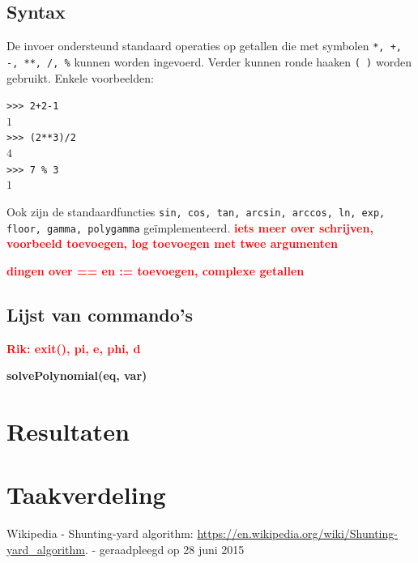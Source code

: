 \documentclass[a4paper]{article}
\newcommand{\rcom}[1]{\textbf{\textcolor{red}{#1}}}
\begin{document}
\subsection{Syntax}
De invoer ondersteund standaard operaties op getallen die met symbolen \texttt{*, +, -, **, /, \%} kunnen worden ingevoerd. Verder kunnen ronde haaken \texttt{( )} worden gebruikt. Enkele voorbeelden:
\begin{adjustwidth}{1.5cm}{}
\texttt{>>> 2+2-1}\\
$1$\\
\texttt{>>> (2**3)/2}\\
$4$\\
\texttt{>>> 7 \% 3}\\
$1$
\end{adjustwidth}
Ook zijn de standaardfuncties \texttt{sin, cos, tan, arcsin, arccos, ln, exp, floor, gamma, polygamma} ge\"implementeerd. \rcom{iets meer over schrijven, voorbeeld toevoegen, log toevoegen met twee argumenten}

\rcom{dingen over == en := toevoegen, complexe getallen}

\subsection{Lijst van commando's}
\rcom{Rik: exit(), pi, e, phi, d}

\textbf{solvePolynomial(eq, var)}



\section{Resultaten}

\section{Taakverdeling}





\begin{thebibliography}{99}

 Wikipedia - Shunting-yard algorithm:
\url{https://en.wikipedia.org/wiki/Shunting-yard_algorithm}. 
 - geraadpleegd op 28 juni 2015

\end{thebibliography}
\end{document}
